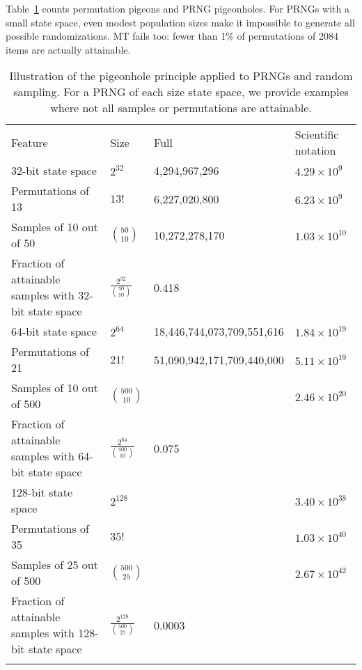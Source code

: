 \documentclass[graybox]{svmult}
\begin{document}
Table~\ref{tab:pigeonhole} counts permutation pigeons and PRNG pigeonholes.
For PRNGs with a small state space, even modest population sizes make it impossible to generate all possible randomizations.
MT fails too: fewer than 1\% of permutations of 2084 items are actually attainable.

\begin{table}
\caption{Illustration of the pigeonhole principle applied to PRNGs and random sampling. For a PRNG of each size state space, we 
provide examples where not all samples or permutations are attainable.}
\label{tab:pigeonhole}       
\begin{tabular}[h]{p{4cm}p{2.4cm}p{4cm}p{2cm}}
\hline\noalign{\smallskip}
Feature & Size & Full & Scientific notation  \\
\noalign{\smallskip}\svhline\noalign{\smallskip}
32-bit state space & $2^{32}$ & 4,294,967,296 & $4.29 \times 10^9$ \\
Permutations of 13 & $13!$ & 6,227,020,800 & $6.23 \times 10^9$ \\
Samples of 10 out of 50 & ${50 \choose 10}$ &  10,272,278,170 & $1.03\times 10^{10} $ \\
Fraction of attainable samples with 32-bit state space & $\frac{2^{32}}{{50 \choose 10}}$   & 0.418 & \\
\noalign{\smallskip}\svhline\noalign{\smallskip}
64-bit state space & $2^{64}$ & 18,446,744,073,709,551,616 & $1.84 \times 10^{19}$ \\
Permutations of 21 & $21!$ &  51,090,942,171,709,440,000 & $5.11 \times 10^{19}$ \\
Samples of 10 out of 500 & ${500 \choose 10}$ & & $2.46 \times 10^{20}$ \\
Fraction of attainable samples with 64-bit state space & $\frac{2^{64}}{{500 \choose 10}}$ &  0.075 & \\
\noalign{\smallskip}\svhline\noalign{\smallskip}
128-bit state space & $2^{128}$ &  & $3.40 \times 10^{38}$ \\
Permutations of 35 & $35!$ &   & $1.03 \times 10^{40}$ \\
Samples of 25 out of 500 & ${500 \choose 25}$ & & $2.67 \times 10^{42}$ \\
Fraction of attainable samples with 128-bit state space & $\frac{2^{128}}{{500 \choose 25}}$ &  0.0003 & \\
\noalign{\smallskip}\svhline\noalign{\smallskip}

\end{tabular}
\end{table}
\end{document}
